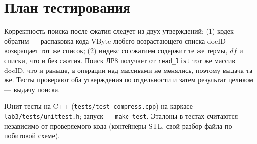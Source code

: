 \section{План тестирования}
Корректность поиска после сжатия следует из двух утверждений: (1) кодек обратим --- распаковка кода VByte любого возрастающего списка docID возвращает тот же список; (2) индекс со сжатием содержит те же термы, $df$ и списки, что и без сжатия. Поиск ЛР8 получает от \texttt{read\_list} тот же массив docID, что и раньше, а операции над массивами не менялись, поэтому выдача та же. Тесты проверяют оба утверждения по отдельности и затем результат целиком --- выдачу поиска.

Юнит-тесты на C++ (\texttt{tests/test\_compress.cpp}) на каркасе \texttt{lab3/tests/unittest.h}; запуск --- \texttt{make test}. Эталоны в тестах считаются независимо от проверяемого кода (контейнеры STL, свой разбор файла по побитовой схеме).

